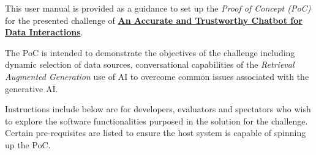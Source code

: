 

This user manual is provided as a guidance to set up the \emph{Proof of Concept (PoC)} for the presented challenge of
\textbf{\href{https://hackerspace.govhack.org/challenges/an_accurate_and_trustworthy_chatbot_for_data_interactions}
{An Accurate and Trustworthy Chatbot for Data Interactions}}.

The PoC is intended to demonstrate the objectives of the challenge including dynamic selection of data sources,
conversational capabilities of the \emph{Retrieval Augmented Generation} use of AI to overcome common issues associated with the generative AI.

Instructions include below are for developers, evaluators and spectators who wish to explore the software
functionalities purposed in the solution for the challenge.
Certain pre-requisites are listed to ensure the host system is capable of spinning up the PoC.


